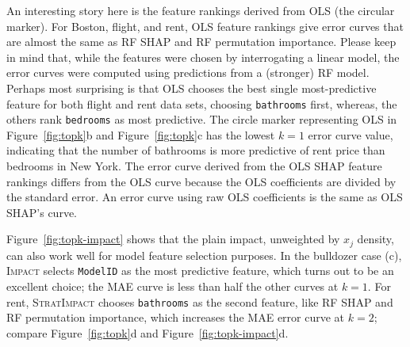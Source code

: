 \documentclass[11pt]{article}
\newcommand{\figref}[1]{Figure~\ref{#1}}
\newcommand{\Imp}{\fontfamily{cmr}\textsc{Impact}}
\newcommand{\simp}{\fontfamily{cmr}\textsc{\small StratImpact}}
\begin{document}
An interesting story here is the feature rankings derived from OLS (the circular marker). For Boston, flight, and rent, OLS feature rankings give error curves that are almost the same as RF SHAP and RF permutation importance.  Please keep in mind that, while the features were chosen by interrogating a linear model, the error curves were  computed using predictions from a (stronger) RF model.  Perhaps most surprising is that OLS chooses the best single most-predictive feature for both flight and rent data sets, choosing {\tt bathrooms} first, whereas, the others rank {\tt bedrooms} as most predictive. The circle marker representing OLS in \figref{fig:topk}b and \figref{fig:topk}c has the lowest $k=1$ error curve value, indicating that the number of bathrooms  is more predictive of rent price than bedrooms in New York. The error curve derived from the OLS SHAP feature rankings differs from the OLS curve because the OLS coefficients are divided by the standard error. An error curve using raw OLS coefficients is the same as OLS SHAP's curve.

\figref{fig:topk-impact} shows that the plain impact, unweighted by $x_j$ density, can also work well for model feature selection purposes. In the bulldozer case (c), \Imp{} selects {\tt ModelID} as the most predictive feature, which turns out to be an excellent choice; the MAE curve is less than half the other curves at $k=1$.  For rent, \simp{} chooses {\tt bathrooms} as the second feature, like RF SHAP and RF permutation importance, which increases the MAE error curve at $k=2$; compare \figref{fig:topk}d and \figref{fig:topk-impact}d.
\end{document}
